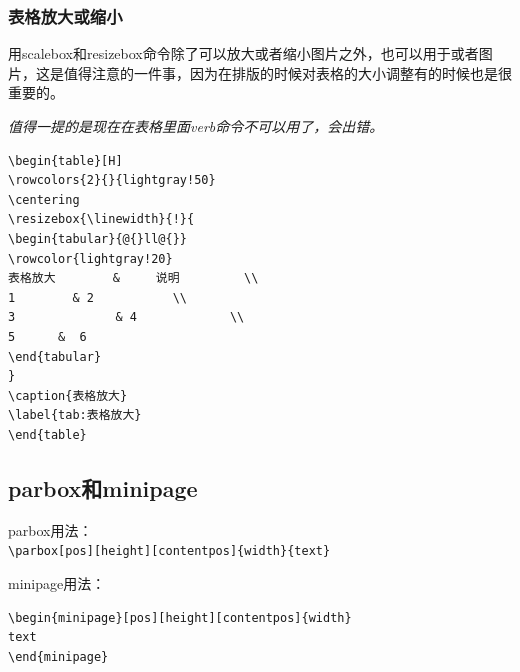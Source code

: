 \documentclass[11pt,oneside]{book}
\begin{document}
\subsubsection{表格放大或缩小}
用scalebox和resizebox命令除了可以放大或者缩小图片之外，也可以用于或者图片，这是值得注意的一件事，因为在排版的时候对表格的大小调整有的时候也是很重要的。

\emph{值得一提的是现在在表格里面verb命令不可以用了，会出错。}

\begin{Verbatim}
\begin{table}[H]
\rowcolors{2}{}{lightgray!50}
\centering
\resizebox{\linewidth}{!}{
\begin{tabular}{@{}ll@{}}
\rowcolor{lightgray!20}
表格放大        &     说明         \\ 
1        & 2           \\
3              & 4             \\
5      &  6        
\end{tabular}
}
\caption{表格放大}
\label{tab:表格放大}
\end{table}
\end{Verbatim}


\begin{table}[H]
\centering
{}
\caption{表格放大}
\label{tab:表格放大}
\end{table}



\subsection{parbox和minipage}
parbox用法：\\
\verb+\parbox[pos][height][contentpos]{width}{text}+

minipage用法：
\begin{Verbatim}
\begin{minipage}[pos][height][contentpos]{width}
text
\end{minipage} 
\end{Verbatim}
\end{document}
